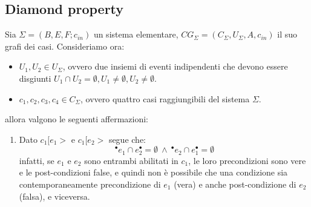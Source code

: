 \subsection{Diamond property}
\begin{definizione} 
    Sia $\Sigma = (B, E, F; c_{in})$ un sistema elementare,
    $CG_{\Sigma} = (C_{\Sigma},U_{\Sigma}, A, c_{in})$ il suo grafi dei casi.
    Consideriamo ora:
    \begin{itemize}
        \item  $U_1,U_2 \in U_{\Sigma}$, ovvero due insiemi di eventi indipendenti
              che devono essere disgiunti $U_1 \cap U_2 = \emptyset, U_1 \neq
                  \emptyset, U_2 \neq \emptyset$.
        \item $c_1, c_2, c_3, c_4 \in C_{\Sigma}$, ovvero quattro casi
              raggiungibili del sistema $\Sigma$.
    \end{itemize}
    allora valgono le seguenti affermazioni:
    \begin{enumerate}
        \item Dato $c_1[e_1 >$ e $c_1[e_2 >$ segue che:
              \begin{equation}
                  ^{\bullet}e_1 \cap e_2^{\bullet} = \emptyset \ \land \
                  ^{\bullet}e_2 \cap e_1^{\bullet} = \emptyset
              \end{equation}
              infatti, se $e_1$ e $e_2$ sono entrambi abilitati in $c_1$, le loro
              precondizioni sono vere e le post-condizioni false, e quindi non è
              possibile che una condizione sia contemporaneamente precondizione di
              $e_1$ (vera) e anche post-condizione di $e_2$ (falsa), e viceversa.


\end{enumerate}
\end{definizione}
